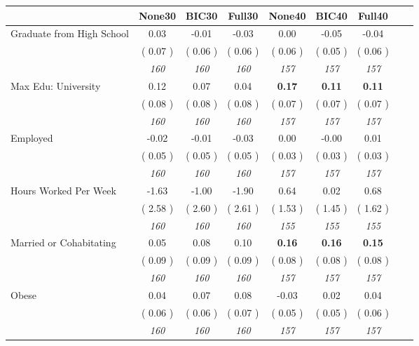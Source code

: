 \begin{tabular}{l c c c c c c c c}
\toprule
 & None30 & BIC30 & Full30 & None40 & BIC40 & Full40 \\
\midrule
Graduate from High School &      0.03 &     -0.01 &     -0.03 &      0.00 &     -0.05 &     -0.04 \\
& (     0.07 ) & (     0.06 ) & (     0.06 ) & (     0.06 ) & (     0.05 ) & (     0.06 ) \\
& \textit{ 160 } & \textit{ 160 } & \textit{ 160 } & \textit{ 157 } & \textit{ 157 } & \textit{ 157 } \\
Max Edu: University &      0.12 &      0.07 &      0.04 & \textbf{      0.17 } & \textbf{      0.11 } & \textbf{      0.11 } \\
& (     0.08 ) & (     0.08 ) & (     0.08 ) & (     0.07 ) & (     0.07 ) & (     0.07 ) \\
& \textit{ 160 } & \textit{ 160 } & \textit{ 160 } & \textit{ 157 } & \textit{ 157 } & \textit{ 157 } \\
Employed &     -0.02 &     -0.01 &     -0.03 &      0.00 &     -0.00 &      0.01 \\
& (     0.05 ) & (     0.05 ) & (     0.05 ) & (     0.03 ) & (     0.03 ) & (     0.03 ) \\
& \textit{ 160 } & \textit{ 160 } & \textit{ 160 } & \textit{ 157 } & \textit{ 157 } & \textit{ 157 } \\
Hours Worked Per Week &     -1.63 &     -1.00 &     -1.90 &      0.64 &      0.02 &      0.68 \\
& (     2.58 ) & (     2.60 ) & (     2.61 ) & (     1.53 ) & (     1.45 ) & (     1.62 ) \\
& \textit{ 160 } & \textit{ 160 } & \textit{ 160 } & \textit{ 155 } & \textit{ 155 } & \textit{ 155 } \\
Married or Cohabitating &      0.05 &      0.08 &      0.10 & \textbf{      0.16 } & \textbf{      0.16 } & \textbf{      0.15 } \\
& (     0.09 ) & (     0.09 ) & (     0.09 ) & (     0.08 ) & (     0.08 ) & (     0.08 ) \\
& \textit{ 160 } & \textit{ 160 } & \textit{ 160 } & \textit{ 157 } & \textit{ 157 } & \textit{ 157 } \\
Obese &      0.04 &      0.07 &      0.08 &     -0.03 &      0.02 &      0.04 \\
& (     0.06 ) & (     0.06 ) & (     0.07 ) & (     0.05 ) & (     0.05 ) & (     0.06 ) \\
& \textit{ 160 } & \textit{ 160 } & \textit{ 160 } & \textit{ 157 } & \textit{ 157 } & \textit{ 157 } \\

\end{tabular}

